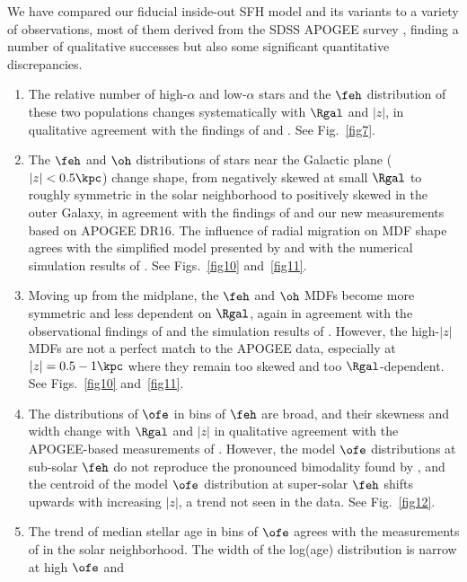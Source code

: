 
We have compared our fiducial inside-out SFH model and its variants to a 
variety of observations, most of them derived from the SDSS APOGEE survey
\citep{Majewski2017}, finding a number of qualitative successes but also
some significant quantitative discrepancies.

\begin{enumerate}

\item The relative number of high-$\alpha$ and low-$\alpha$ stars and the
  $\feh$ distribution of these two populations changes systematically with
  $\Rgal$ and $|z|$, in qualitative agreement with the findings of 
  \cite{Nidever2014} and \cite{Hayden2015}.  See Fig.~\ref{fig7}.
\item The $\feh$ and $\oh$ distributions of stars near the Galactic plane
  ($|z|<0.5\kpc$) change shape, from negatively skewed at small $\Rgal$
  to roughly symmetric in the solar neighborhood to positively skewed in
  the outer Galaxy, in agreement with the findings of \cite{Hayden2015}
  and our new measurements based on APOGEE DR16.  The influence of radial
  migration on MDF shape agrees with the simplified model presented
  by \cite{Hayden2015} and with the numerical simulation results of
  \cite{Loebman2016}.  See Figs.~\ref{fig10} and~\ref{fig11}.
\item Moving up from the midplane, the $\feh$ and $\oh$ MDFs become more
  symmetric and less dependent on $\Rgal$, again in agreement with the
  observational findings of \cite{Hayden2015} and the simulation results
  of \cite{Loebman2016}.  However, the high-$|z|$ MDFs are not a perfect
  match to the APOGEE data, especially at $|z|=0.5-1\kpc$ where they 
  remain too skewed and too $\Rgal$-dependent.  See Figs.~\ref{fig10}
  and~\ref{fig11}.
\item The distributions of $\ofe$ in bins of $\feh$ are broad, and their
  skewness and width change with $\Rgal$ and $|z|$ in qualitative 
  agreement with the APOGEE-based measurements of \cite{Vincenzo2021}.
  However, the model $\ofe$ distributions at sub-solar $\feh$ do not
  reproduce the pronounced bimodality found by \cite{Vincenzo2021}, and
  the centroid of the model $\ofe$ distribution at super-solar $\feh$
  shifts upwards with increasing $|z|$, a trend not seen in the data.
  See Fig.~\ref{fig12}.
\item The trend of median stellar age in bins of $\ofe$ agrees with the
  measurements of \cite{Feuillet2019} in the solar neighborhood.  The 
  width of the log(age) distribution is narrow at high $\ofe$ and

\end{enumerate}

